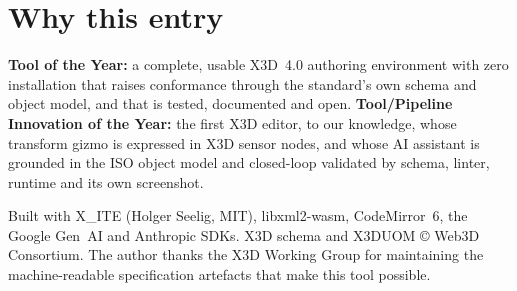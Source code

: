 \documentclass[10pt,a4paper,twocolumn]{article}
\begin{document}
\section{Why this entry}
\textbf{Tool of the Year:} a complete, usable X3D~4.0 authoring environment with zero installation that raises conformance through the standard's own schema and object model, and that is tested, documented and open. \textbf{Tool/Pipeline Innovation of the Year:} the first X3D editor, to our knowledge, whose transform gizmo is expressed in X3D sensor nodes, and whose AI assistant is grounded in the ISO object model and closed-loop validated by schema, linter, runtime and its own screenshot.

\vspace{4pt}
\noindent\small Built with X\_ITE (Holger Seelig, MIT), libxml2-wasm, CodeMirror~6, the Google Gen~AI and Anthropic SDKs. X3D schema and X3DUOM \copyright{} Web3D Consortium. The author thanks the X3D Working Group for maintaining the machine-readable specification artefacts that make this tool possible.
\end{document}
